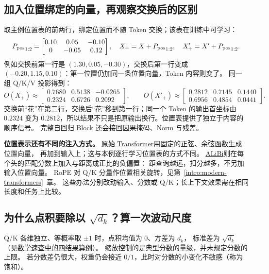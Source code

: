 \subsection{加入位置绑定的向量，再观察交换后的区别}
\label{sec:position-input}
取主例位置表的前两行，绑定位置而不随 Token 交换；该表在训练中可学习：
\[
{P_{\rm pos}}_{1:2}=\begin{bmatrix}
0.10&0.05&-0.10\\0&-0.05&0.12
\end{bmatrix},\quad
X_+=X+{P_{\rm pos}}_{1:2},\quad X'_+=X'+{P_{\rm pos}}_{1:2}.
\]
例如交换前第一行是 $(1.30,0.05,-0.30)$，交换后第一行变成
$(-0.20,1.15,0.10)$：第一位置仍加同一条位置向量，Token 内容则变了。
同一组 Q/K/V 投影得到：
\begin{equation}
O(X_+)\approx\begin{bmatrix}
0.7680&0.5138&-0.0265\\0.2324&0.6726&0.2092
\end{bmatrix},\qquad
O(X'_+)\approx\begin{bmatrix}
0.2812&0.7145&0.1440\\0.6956&0.4854&0.0441
\end{bmatrix}.
\label{eq:pos-swap-d3}
\end{equation}
交换前“花”在第二行，交换后“花”移到第一行；同一个 Token 的输出首坐标由 $0.2324$ 变为 $0.2812$，所以结果不只是把原输出换行。位置表提供了独立于内容的顺序信号。
完整自回归 Block 还会接回因果掩码、Norm 与残差。

\textbf{位置表示还有不同的注入方式。}
\hyperref[source:attention-original]{原始 Transformer}用固定的正弦、余弦函数生成位置向量，
再加到输入上；这与本例逐行学习位置表的方式不同。
\label{concept:alibi}%
\hyperref[source:alibi]{ALiBi}则在每个头的匹配分数上加入与距离成正比的负偏置：
距查询越远，扣分越多，不另加输入位置向量。
RoPE 对 Q/K 分量作位置相关旋转，见第~\ref*{intro:modern-transformers}~章。
这些办法分别改动输入、分数或 Q/K；长上下文效果需在相同长度和任务上比较。

\subsection{\texorpdfstring{为什么点积要除以 $\sqrt{d_k}$？算一次波动尺度}{为什么点积要除以 Key 维度平方根？}}
\label{concept:scaled-dot-product}

Q/K 各维独立、等概率取 $\pm1$ 时，点积均值为 $0$、方差为 $d_k$，
标准差为 $\sqrt{d_k}$（见\hyperref[app:variance-scaling]{数学速查中的四结果算例}）。
缩放控制的是典型分数的量级，并未规定分数的上限。
若分数差仍很大，权重仍会接近 $0/1$，此时对分数的小变化不敏感（称为饱和）。

